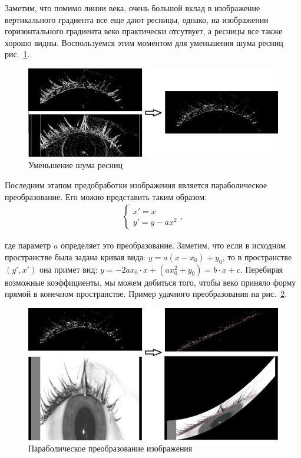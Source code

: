 \documentclass[12pt,a4paper]{article} %
\begin{document}
Заметим, что помимо линии века, очень большой вклад в изображение вертикального градиента все еще дают ресницы, однако, на изображении горизонтального градиента веко практически отсутвует, а ресницы все также хорошо видны. Воспользуемся этим моментом для уменьшения шума ресниц рис.~\ref{fig:diff}.
\begin{figure}[h]
	
	\centering
	
	\includegraphics[width=0.8\linewidth]{diff.jpg}
	
	\caption{Уменьшение шума ресниц}
	
	\label{fig:diff}
	
\end{figure}

Последним этапом предобработки изображения является параболическое преобразование. Его можно представить таким образом:
\begin{gather}\label{parab2}
\begin{cases}
		x' = x
		\\
		y' = y - ax^2
	\end{cases},
\end{gather}

где параметр $a$ определяет это преобразование. Заметим, что если в исходном пространстве была задана кривая вида: $y = a(x-x_0) + y_0$, то в пространстве $(y', x')$ она примет вид: $y = -2ax_0\cdot x + (ax_0^2 + y_0) = b\cdot x + c$. Перебирая возможные коэффициенты, мы можем добиться того, чтобы веко приняло форму прямой в конечном пространстве. Пример удачного преобразования на рис.~\ref{fig:parab}.

\begin{figure}[h]
	
	\centering
	
	\includegraphics[width=0.8\linewidth]{parab.jpg}
	
	\caption{Параболическое преобразование изображения}
	
	\label{fig:parab}
	
\end{figure}
\end{document}
